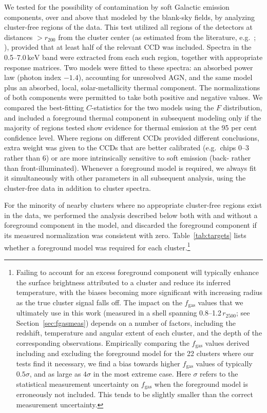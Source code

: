 \documentclass[useAMS,usenatbib,usegraphicx]{mn2e}
\newcommand*{\mysub}[2]{\ensuremath{#1_{\mathrm{#2}}}}
\newcommand*{\unit}[1]{\ensuremath{\mathrm{\, #1}}}
\newcommand*{\fgas}{\mysub{f}{gas}}
\newcommand*{\keV}{\unit{keV}}
\newcommand*{\secref}{Section}
\newcommand*{\tabref}{Table}
\newcommand*{\arsemf}{\citetalias{Allen0706.0033}}
\begin{document}
We tested for the possibility of contamination by soft Galactic emission components, over and above that modeled by the blank-sky fields, by analyzing cluster-free regions of the data. This test utilized all regions of the detectors at distances $>r_{200}$ from the cluster center (as estimated from the literature, e.g.\ \arsemf{}; \citealt{Mantz0909.3099, Andersson1006.3068}), provided that at least half of the relevant CCD was included. Spectra in the 0.5--7.0\keV{} band were extracted from each such region, together with appropriate response matrices. Two models were fitted to these spectra: an absorbed power law (photon index $-1.4$), accounting for unresolved AGN, and the same model plus an absorbed, local, solar-metallicity thermal component. The normalizations of both components were permitted to take both positive and negative values. We compared the best-fitting $C$-statistics for the two models using the $F$ distribution, and included a foreground thermal component in subsequent modeling only if the majority of regions tested show evidence for thermal emission at the 95 per cent confidence level. Where regions on different CCDs provided different conclusions, extra weight was given to the CCDs that are better calibrated (e.g.\ chips 0--3 rather than 6) or are more intrinsically sensitive to soft emission (back- rather than front-illuminated). Whenever a foreground model is required, we always fit it simultaneously with other parameters in all subsequent analysis, using the cluster-free data in addition to cluster spectra.

For the minority of nearby clusters where no appropriate cluster-free regions exist in the data, we performed the analysis described below both with and without a foreground component in the model, and discarded the foreground component if its measured normalization was consistent with zero. \tabref~\ref{tab:targets} lists whether a foreground model was required for each cluster.\footnote{Failing to account for an excess foreground component will typically enhance the surface brightness attributed to a cluster and reduce its inferred temperature, with the biases becoming more significant with increasing radius as the true cluster signal falls off. The impact on the \fgas{} values that we ultimately use in this work (measured in a shell spanning 0.8--1.2\,$r_{2500}$; see \secref~\ref{sec:fgasmeas}) depends on a number of factors, including the redshift, temperature and angular extent of each cluster, and the depth of the corresponding observations. Empirically comparing the \fgas{} values derived including and excluding the foreground model for the 22 clusters where our tests find it necessary, we find a bias towards higher \fgas{} values of typically $0.5\sigma$, and as large as $4\sigma$ in the most extreme case. Here $\sigma$ refers to the statistical measurement uncertainty on \fgas{} when the foreground model is erroneously not included. This tends to be slightly smaller than the correct measurement uncertainty.}
\end{document}
